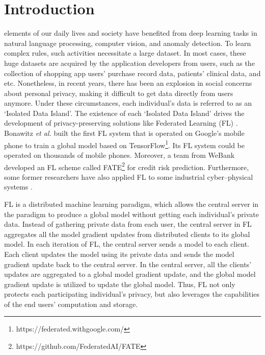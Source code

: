 \documentclass[journal]{IEEEtran}
\begin{document}
\section{Introduction}
 elements of our daily lives and society have benefited from deep learning tasks in natural language processing, computer vision, and anomaly detection. To learn complex rules, such activities necessitate a large dataset. In most cases, these huge datasets are acquired by the application developers from users, such as the collection of shopping app users' purchase record data, patients' clinical data, and etc. Nonetheless, in recent years, there has been an explosion in social concerns about personal privacy, making it difficult to get data directly from users anymore. Under these circumstances, each individual's data is referred to as an `Isolated Data Island'. The existence of each `Isolated Data Island' drives the development of privacy-preserving solutions like Federated Learning (FL) \cite{ref_01_GoogleFL,ref_02_FLConcept,li2021a}. Bonawitz \textit{et al.} built the first FL system that is operated on Google's mobile phone to train a global model based on TensorFlow\footnote{https://federated.withgoogle.com/}. Its FL system could be operated on thousands of mobile phones. Moreover, a team from WeBank developed an FL scheme called FATE\footnote{https://github.com/FederatedAI/FATE} for credit risk prediction. Furthermore, some former researchers have also applied FL to some industrial cyber–physical systems \cite{ref_42_FLApp, ref_43_FLApp, hao2020hao}.

\par FL is a distributed machine learning paradigm, which allows the central server in the paradigm to produce a global model without getting each individual's private data. Instead of gathering private data from each user, the central server in FL aggregates all the model gradient updates from distributed clients to its global model. In each iteration of FL, the central server sends a model to each client. Each client updates the model using its private data and sends the model gradient update back to the central server. In the central server, all the clients' updates are aggregated to a global model gradient update, and the global model gradient update is utilized to update the global model. Thus, FL not only protects each participating individual's privacy, but also leverages the capabilities of the end users' computation and storage.
\end{document}
